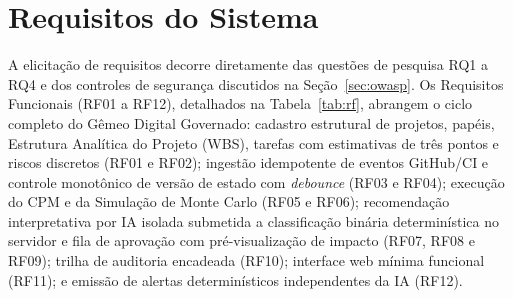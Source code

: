 \documentclass[12pt,openany,oneside,a4paper,english,brazilian,sumario=tradicional]{abntex2}
\begin{document}
\section{Requisitos do Sistema}\label{sec:requisitos}

A elicitação de requisitos decorre diretamente das questões de pesquisa RQ1 a RQ4 e dos controles de segurança discutidos na Seção~\ref{sec:owasp}. Os Requisitos Funcionais (RF01 a RF12), detalhados na Tabela~\ref{tab:rf}, abrangem o ciclo completo do Gêmeo Digital Governado: cadastro estrutural de projetos, papéis, Estrutura Analítica do Projeto (WBS), tarefas com estimativas de três pontos e riscos discretos (RF01 e RF02); ingestão idempotente de eventos GitHub/CI e controle monotônico de versão de estado com \textit{debounce} (RF03 e RF04); execução do CPM e da Simulação de Monte Carlo (RF05 e RF06); recomendação interpretativa por IA isolada submetida a classificação binária determinística no servidor e fila de aprovação com pré-visualização de impacto (RF07, RF08 e RF09); trilha de auditoria encadeada (RF10); interface web mínima funcional (RF11); e emissão de alertas determinísticos independentes da IA (RF12).
\end{document}
